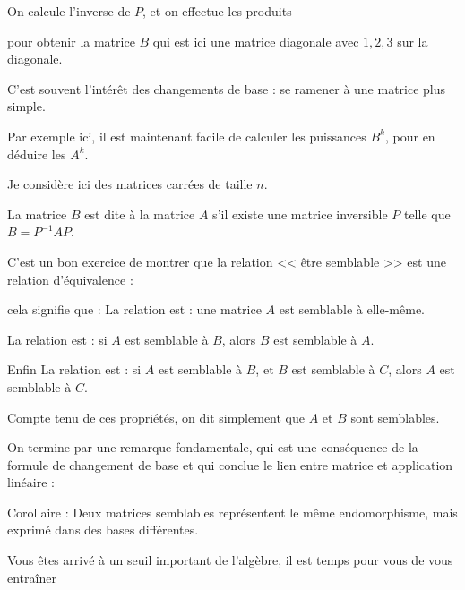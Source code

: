 \change
On calcule l'inverse de $P$, et on effectue les produits

\change
pour obtenir la matrice $B$
qui est ici une matrice diagonale avec $1,2,3$ sur la diagonale.


C'est souvent l'intérêt des changements de base : se ramener à une matrice plus simple.


Par exemple ici, il est maintenant facile de calculer les puissances $B^k$, 
pour en déduire les $A^k$.


\diapo


Je considère ici des matrices carrées de taille $n$.

La matrice $B$ est dite  à la matrice $A$ s'il existe une
matrice inversible $P$ telle que
$B=P^{-1}AP$.
   
   
\change
C'est un bon exercice de montrer que la relation << être semblable >> est une relation 
d'équivalence :

\change
cela signifie que :
La relation est  : une matrice $A$ est semblable à elle-même.

\change
La relation est  : si $A$ est semblable à $B$, 
  alors $B$ est semblable à $A$.

\change
Enfin La relation est  : si $A$ est semblable à $B$, 
  et $B$ est semblable à $C$, alors $A$ est semblable à $C$.

  

Compte tenu de ces propriétés, on dit simplement que $A$ et $B$ sont 
semblables.

\change
On termine par une remarque fondamentale, qui est une conséquence de la formule de changement de base et qui conclue le lien entre matrice et application linéaire :

Corollaire : Deux matrices semblables représentent le même endomorphisme, mais exprimé dans
des bases différentes.



\diapo

Vous êtes arrivé à un seuil important de l'algèbre,
il est temps pour vous de vous entraîner 


